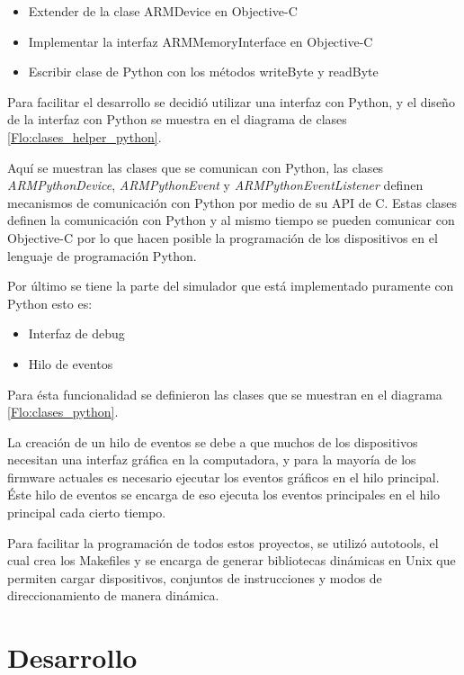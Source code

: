 \begin{itemize}
\item Extender de la clase ARMDevice en Objective-C
\item Implementar la interfaz ARMMemoryInterface en Objective-C
\item Escribir clase de Python con los métodos writeByte y readByte
\end{itemize}

Para facilitar el desarrollo se decidió utilizar una interfaz con Python, y el diseño de la interfaz con Python se muestra en el diagrama de clases \ref{Flo:clases_helper_python}.

Aquí se muestran las clases que se comunican con Python, las clases \emph{ARMPythonDevice}, \emph{ARMPythonEvent} y \emph{ARMPythonEventListener} definen mecanismos de comunicación con Python por medio de su API de C. Estas clases definen la comunicación con Python y al mismo tiempo se pueden comunicar con Objective-C por lo que hacen posible la programación de los dispositivos en el lenguaje de programación Python.

Por último se tiene la parte del simulador que está implementado puramente con Python esto es:

\begin{itemize}
\item Interfaz de debug
\item Hilo de eventos
\end{itemize}

Para ésta funcionalidad se definieron las clases que se muestran en el diagrama \ref{Flo:clases_python}.

La creación de un hilo de eventos se debe a que muchos de los dispositivos necesitan una interfaz gráfica en la computadora, y para la mayoría de los firmware actuales es necesario ejecutar los eventos gráficos en el hilo principal. Éste hilo de eventos se encarga de eso ejecuta los eventos principales en el hilo principal cada cierto tiempo.

Para facilitar la programación de todos estos proyectos, se utilizó autotools, el cual crea los Makefiles y se encarga de generar bibliotecas dinámicas en Unix que permiten cargar dispositivos, conjuntos de instrucciones y modos de direccionamiento de manera dinámica.

\section{Desarrollo}

